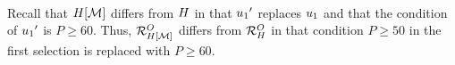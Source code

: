 \begin{exam}
{\begin{minipage}{1.0\linewidth}
\begin{align*}
\end{align*}
\end{minipage}
}

Recall that $H[\mathcal{M}]$ differs from $H$ in that ${u_1}'$ replaces $u_1$ and that the condition of ${u_1}'$ is $P \geq 60$. Thus,
$\mathcal{R}^{O}_{H[\mathcal{M}]}$ differs from $\mathcal{R}^{O}_{H}$ in that condition $P \geq 50$ in the first selection is replaced with $P \geq 60$.
\end{exam}








